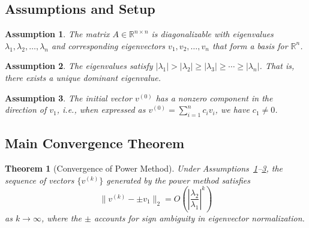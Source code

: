 \documentclass[11pt,a4paper]{article}
\newtheorem{theorem}{Theorem}
\newtheorem{assumption}{Assumption}
\begin{document}
\subsection{Assumptions and Setup}

\begin{assumption}\label{ass:diagonalizable}
The matrix $A \in \mathbb{R}^{n \times n}$ is diagonalizable with eigenvalues $\lambda_1, \lambda_2, \ldots, \lambda_n$ and corresponding eigenvectors $v_1, v_2, \ldots, v_n$ that form a basis for $\mathbb{R}^n$.
\end{assumption}

\begin{assumption}\label{ass:dominant}
The eigenvalues satisfy $|\lambda_1| > |\lambda_2| \geq |\lambda_3| \geq \cdots \geq |\lambda_n|$. That is, there exists a unique dominant eigenvalue.
\end{assumption}

\begin{assumption}\label{ass:initial}
The initial vector $v^{(0)}$ has a nonzero component in the direction of $v_1$, i.e., when expressed as $v^{(0)} = \sum_{i=1}^n c_i v_i$, we have $c_1 \neq 0$.
\end{assumption}

\subsection{Main Convergence Theorem}

\begin{theorem}[Convergence of Power Method]\label{thm:convergence}
Under Assumptions~\ref{ass:diagonalizable}--\ref{ass:initial}, the sequence of vectors $\{v^{(k)}\}$ generated by the power method satisfies
\begin{equation}
\|v^{(k)} - \pm v_1\|_2 = O\left(\left|\frac{\lambda_2}{\lambda_1}\right|^k\right)
\end{equation}
as $k \to \infty$, where the $\pm$ accounts for sign ambiguity in eigenvector normalization.
\end{theorem}
\end{document}
